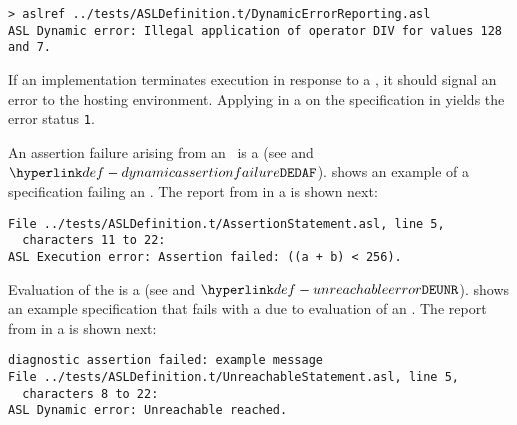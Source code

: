 
\begin{Verbatim}[fontsize=\footnotesize, frame=single]
> aslref ../tests/ASLDefinition.t/DynamicErrorReporting.asl
ASL Dynamic error: Illegal application of operator DIV for values 128 and 7.
\end{Verbatim}

If an implementation terminates execution in response to a \dynamicerrorterm{},
it should signal an error to the hosting environment.
%
Applying \aslref{} in a \linuxbashshell{} on the specification in 
yields the error status \texttt{1}.

An assertion failure arising from an \assertionstatementterm\ is a \dynamicerrorterm{}
(see  and \errorcodeterm{} $\DynamicAssertionFailure$).
%
 shows an example of a specification failing
an \assertionstatementterm{}.
The report from \aslref{} in a \linuxbashshell{} is shown next:
\begin{Verbatim}[fontsize=\footnotesize, frame=single]
File ../tests/ASLDefinition.t/AssertionStatement.asl, line 5,
  characters 11 to 22:
ASL Execution error: Assertion failed: ((a + b) < 256).
\end{Verbatim}

Evaluation of the \unreachablestatementterm{} is a \dynamicerrorterm{}
(see  and \errorcodeterm{} $\UnreachableError$).
%
 shows an example specification that
fails with a \dynamicerrorsterm{} due to evaluation of an \unreachablestatementterm{}.
The report from \aslref{} in a \linuxbashshell{} is shown next:

\begin{Verbatim}[fontsize=\footnotesize, frame=single]
diagnostic assertion failed: example message
File ../tests/ASLDefinition.t/UnreachableStatement.asl, line 5,
  characters 8 to 22:
ASL Dynamic error: Unreachable reached.
\end{Verbatim}

